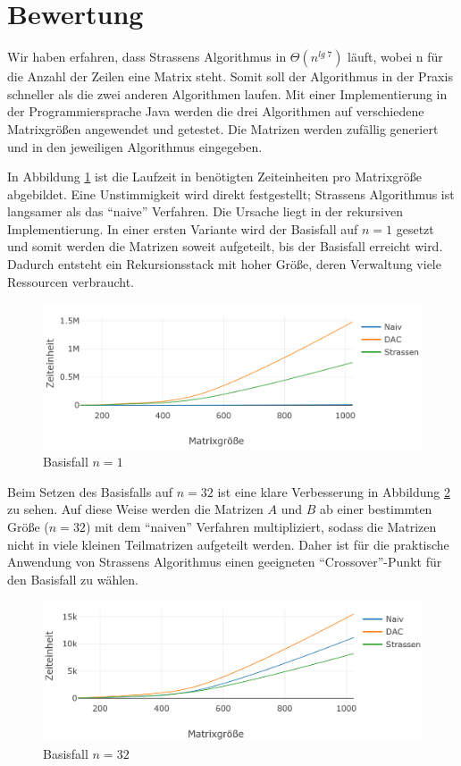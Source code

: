 \section{Bewertung}
\label{sec:abschn3}
Wir haben erfahren, dass Strassens Algorithmus in $\Theta(n^{lg\;7})$ läuft, wobei n für
die Anzahl der Zeilen eine Matrix steht. Somit soll der Algorithmus in der Praxis schneller als die zwei anderen Algorithmen laufen. Mit einer Implementierung in der Programmiersprache Java werden die drei Algorithmen auf verschiedene Matrixgrößen angewendet und getestet. Die Matrizen werden zufällig generiert und in den jeweiligen Algorithmus eingegeben. 

In Abbildung \ref{1} ist die Laufzeit in benötigten Zeiteinheiten pro Matrixgröße abgebildet. Eine Unstimmigkeit wird direkt festgestellt; Strassens Algorithmus ist langsamer als das \enquote{naive} Verfahren. Die Ursache liegt in der rekursiven Implementierung. In einer ersten Variante wird der Basisfall auf $n = 1$ gesetzt und somit werden die Matrizen soweit aufgeteilt, bis der Basisfall erreicht wird. Dadurch entsteht ein Rekursionsstack mit hoher Größe, deren Verwaltung viele Ressourcen verbraucht.

\begin{figure}[H]
    \center
    \includegraphics[scale=0.38]{basisfallnot.png}
    \caption{Basisfall $n = 1$}
    \label{1}
\end{figure}

Beim Setzen des Basisfalls auf $n = 32$ ist eine klare Verbesserung in Abbildung \ref{32} zu sehen. Auf diese Weise werden die Matrizen $A$ und $B$ ab einer bestimmten Größe ($n = 32$) mit dem \enquote{naiven} Verfahren multipliziert, sodass die Matrizen nicht in viele kleinen Teilmatrizen aufgeteilt werden. Daher ist für die praktische Anwendung von Strassens Algorithmus einen geeigneten \enquote{Crossover}-Punkt für den Basisfall zu wählen.
\begin{figure}[H]
    \center
    \includegraphics[scale=0.38]{basisfallmod.png}
    \caption{Basisfall $n = 32$}
    \label{32}
\end{figure}